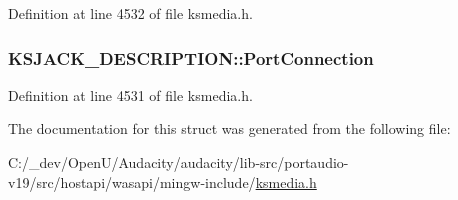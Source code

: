 Definition at line 4532 of file ksmedia.\+h.

\subsubsection[{\texorpdfstring{Port\+Connection}{PortConnection}}]{ K\+S\+J\+A\+C\+K\+\_\+\+D\+E\+S\+C\+R\+I\+P\+T\+I\+O\+N\+::\+Port\+Connection}\hypertarget{struct_k_s_j_a_c_k___d_e_s_c_r_i_p_t_i_o_n_a8404a8021c3738727574ab02da9b70b2}{}\label{struct_k_s_j_a_c_k___d_e_s_c_r_i_p_t_i_o_n_a8404a8021c3738727574ab02da9b70b2}


Definition at line 4531 of file ksmedia.\+h.



The documentation for this struct was generated from the following file\+:\begin{DoxyCompactItemize}
\item 
C\+:/\+\_\+dev/\+Open\+U/\+Audacity/audacity/lib-\/src/portaudio-\/v19/src/hostapi/wasapi/mingw-\/include/\hyperlink{ksmedia_8h}{ksmedia.\+h}\end{DoxyCompactItemize}
